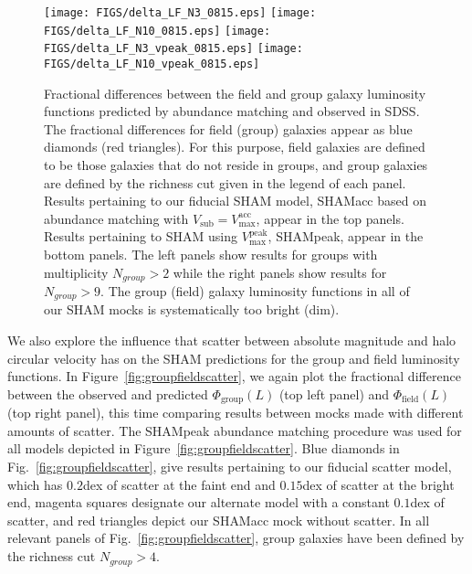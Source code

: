 \documentclass[usenatbib,usegraphicx,letterpaper]{mn2e}
\newcommand{\vpeak}{V_{\mathrm{max}}^{\mathrm{peak}}}
\newcommand{\vacc}{V_{\mathrm{max}}^{\mathrm{acc}}}
\newcommand{\vsub}{V_{\mathrm{sub}}}
\begin{document}
\begin{figure*}
\centering
\texttt{[image: FIGS/delta\_LF\_N3\_0815.eps]}
\texttt{[image: FIGS/delta\_LF\_N10\_0815.eps]}
\texttt{[image: FIGS/delta\_LF\_N3\_vpeak\_0815.eps]}
\texttt{[image: FIGS/delta\_LF\_N10\_vpeak\_0815.eps]}
\caption{
Fractional differences between the field and group galaxy
luminosity functions predicted by abundance matching and observed 
in SDSS. The fractional differences for field (group) galaxies appear as 
blue diamonds (red triangles). For this purpose, field galaxies are
defined to be those galaxies that do not reside in groups, and group galaxies 
are defined by the richness cut given in the legend of each panel. 
Results pertaining to our fiducial SHAM model, SHAMacc based on abundance matching with 
$\vsub=\vacc$, appear in the top panels. Results pertaining to SHAM using $\vpeak$, SHAMpeak, 
appear in the bottom panels. The left panels show results for groups with multiplicity 
$N_{group}>2$ while the right panels show results for $N_{group}>9$. 
The group (field) galaxy luminosity functions in all of our 
SHAM mocks is systematically too bright (dim).
 }
\label{fig:groupfield}
\end{figure*}

We also explore the influence that scatter between absolute magnitude and halo circular velocity has on 
the SHAM predictions for the group and field luminosity functions. In Figure~\ref{fig:groupfieldscatter}, 
we again plot the fractional difference between the observed and predicted $\Phi_{\mathrm{group}}(L)$ (top left panel) 
and $\Phi_{\mathrm{field}}(L)$ (top right panel), this time comparing results between mocks made with 
different amounts of scatter. The SHAMpeak abundance matching procedure was used for all models 
depicted in Figure~\ref{fig:groupfieldscatter}. Blue diamonds in Fig.~\ref{fig:groupfieldscatter}, 
give results pertaining to our fiducial scatter model, 
which has $0.2$dex of scatter at the faint end and $0.15$dex of scatter at the bright end, 
magenta squares designate our alternate model with a constant $0.1$dex of scatter, 
and red triangles depict our SHAMacc mock without scatter. 
In all relevant panels of Fig.~\ref{fig:groupfieldscatter}, group galaxies have been 
defined by the richness cut $N_{group}>4.$ 
\end{document}

